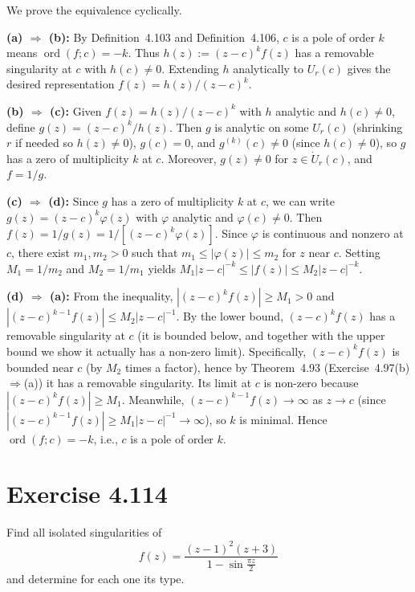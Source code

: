 \documentclass{article}
\begin{document}
\begin{solution}
  We prove the equivalence cyclically.

  \medskip
  \noindent\textbf{(a) $\Rightarrow$ (b):}
  By Definition~4.103 and Definition~4.106, $c$ is a pole of order $k$ means
  $\operatorname{ord}(f; c) = -k$. Thus $h(z) := (z-c)^k f(z)$ has a removable
  singularity at $c$ with $h(c) \ne 0$. Extending $h$ analytically to $U_r(c)$
  gives the desired representation $f(z) = h(z)/(z-c)^k$.

  \medskip
  \noindent\textbf{(b) $\Rightarrow$ (c):}
  Given $f(z) = h(z)/(z-c)^k$ with $h$ analytic and $h(c) \ne 0$, define
  $g(z) = (z-c)^k/h(z)$. Then $g$ is analytic on some $U_r(c)$ (shrinking $r$
  if needed so $h(z) \ne 0$), $g(c) = 0$, and $g^{(k)}(c) \ne 0$ (since
  $h(c) \ne 0$), so $g$ has a zero of multiplicity $k$ at $c$. Moreover,
  $g(z) \ne 0$ for $z \in \dot{U}_r(c)$, and $f = 1/g$.

  \medskip
  \noindent\textbf{(c) $\Rightarrow$ (d):}
  Since $g$ has a zero of multiplicity $k$ at $c$, we can write
  $g(z) = (z-c)^k \varphi(z)$ with $\varphi$ analytic and $\varphi(c) \ne 0$.
  Then $f(z) = 1/g(z) = 1/[(z-c)^k \varphi(z)]$. Since $\varphi$ is continuous
  and nonzero at $c$, there exist $m_1, m_2 > 0$ such that
  $m_1 \le |\varphi(z)| \le m_2$ for $z$ near $c$. Setting $M_1 = 1/m_2$ and
  $M_2 = 1/m_1$ yields $M_1 |z-c|^{-k} \le |f(z)| \le M_2 |z-c|^{-k}$.

  \medskip
  \noindent\textbf{(d) $\Rightarrow$ (a):}
  From the inequality, $|(z-c)^k f(z)| \ge M_1 > 0$ and
  $|(z-c)^{k-1} f(z)| \le M_2 |z-c|^{-1}$. By the lower bound, $(z-c)^k f(z)$
  has a removable singularity at $c$ (it is bounded below, and together with the
  upper bound we show it actually has a non-zero limit). Specifically,
  $(z-c)^k f(z)$ is bounded near $c$ (by $M_2$ times a factor), hence by
  Theorem~4.93 (Exercise~4.97(b)$\Rightarrow$(a)) it has a removable singularity.
  Its limit at $c$ is non-zero because $|(z-c)^k f(z)| \ge M_1$.
  Meanwhile, $(z-c)^{k-1} f(z) \to \infty$ as $z \to c$ (since
  $|(z-c)^{k-1} f(z)| \ge M_1 |z-c|^{-1} \to \infty$), so $k$ is minimal.
  Hence $\operatorname{ord}(f; c) = -k$, i.e., $c$ is a pole of order $k$.
\end{solution}

\section{Exercise 4.114}

Find all isolated singularities of
\[
  f(z) = \frac{(z-1)^2(z+3)}{1 - \sin\frac{\pi z}{2}}
\]
and determine for each one its type.
\end{document}

